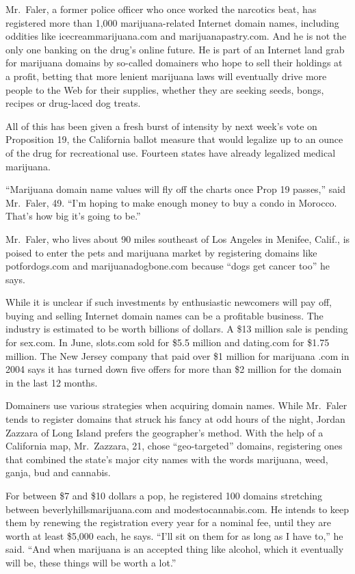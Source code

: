 ﻿\documentclass[12pt]{article}
\begin{document}
Mr.~Faler, a former police officer who once worked the narcotics beat, has registered more than
1,000 marijuana-related Internet domain names, including oddities like icecreammarijuana.com and
marijuanapastry.com. And he is not the only one banking on the drug's online future. He is part of
an Internet land grab for marijuana domains by so-called domainers who hope to sell their holdings
at a profit, betting that more lenient marijuana laws will eventually drive more people to the Web
for their supplies, whether they are seeking seeds, bongs, recipes or drug-laced dog treats.

All of this has been given a fresh burst of intensity by next week's vote on Proposition 19, the
California ballot measure that would legalize up to an ounce of the drug for recreational use.
Fourteen states have already legalized medical marijuana.

``Marijuana domain name values will fly off the charts once Prop 19 passes,'' said Mr.~Faler, 49.
``I'm hoping to make enough money to buy a condo in Morocco. That's how big it's going to be.''

Mr.~Faler, who lives about 90 miles southeast of Los Angeles in Menifee, Calif., is poised to enter
the pets and marijuana market by registering domains like potfordogs.com and marijuanadogbone.com
because ``dogs get cancer too'' he says.

While it is unclear if such investments by enthusiastic newcomers will pay off, buying and selling
Internet domain names can be a profitable business. The industry is estimated to be worth billions
of dollars. A \$13 million sale is pending for sex.com. In June, slots.com sold for \$5.5 million
and dating.com for \$1.75 million. The New Jersey company that paid over \$1 million for marijuana
.com in 2004 says it has turned down five offers for more than \$2 million for the domain in the
last 12 months.

Domainers use various strategies when acquiring domain names. While Mr.~Faler tends to register
domains that struck his fancy at odd hours of the night, Jordan Zazzara of Long Island prefers the
geographer's method. With the help of a California map, Mr.~Zazzara, 21, chose ``geo-targeted''
domains, registering ones that combined the state's major city names with the words marijuana, weed,
ganja, bud and cannabis.

For between \$7 and \$10 dollars a pop, he registered 100 domains stretching between
beverlyhillsmarijuana.com and modestocannabis.com. He intends to keep them by renewing the
registration every year for a nominal fee, until they are worth at least \$5,000 each, he says.
``I'll sit on them for as long as I have to,'' he said. ``And when marijuana is an accepted thing
like alcohol, which it eventually will be, these things will be worth a lot.''
\end{document}
